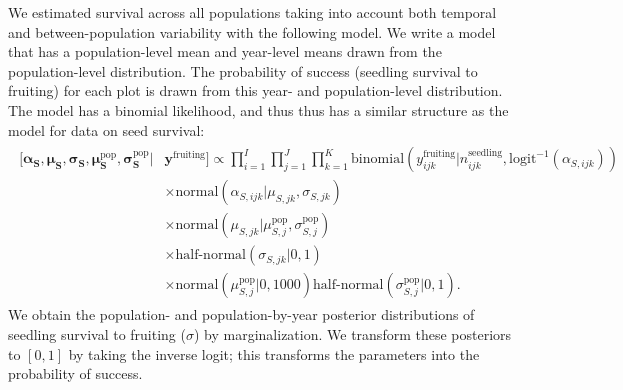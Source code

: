 \documentclass[12pt, oneside, titlepage]{article}   	%
\begin{document}
We estimated survival across all populations taking into account both temporal and between-population variability with the following model. We write a model that has a population-level mean and year-level means drawn from the population-level distribution. The probability of success (seedling survival to fruiting) for each plot is drawn from this year- and population-level distribution. The model has a binomial likelihood, and thus thus has a similar structure as the model for data on seed survival:
%
\begin{align}
  \begin{split}
 [  \bm{\alpha_S} , \bm{\mu_S} , \bm{\sigma_S} , \bm{\mu^\mathrm{pop}_S}, \bm{\sigma^\mathrm{pop}_S} | & \bm{y^{\mathrm{fruiting}}}  ] \propto \prod_{i=1}^{I}   \prod_{j=1}^{J}  \prod_{k=1}^{K} 
   \mathrm{binomial} ( y^{\mathrm{fruiting}}_{ijk} | n^\mathrm{seedling}_{ijk}, \mathrm{logit}^{-1}( \alpha_{S,ijk} ) ) 
   \\ & \times \mathrm{normal} ( \alpha_{S,ijk}  | \mu_{S,jk}, \sigma{_{S,jk} })
  \\ & \times \mathrm{normal} ( \mu_{S,jk}  | \mu^\mathrm{pop}_{S,j}, \sigma^\mathrm{pop}_{S,j} )
  \\ & \times \textrm{half-normal} ( \sigma_{S,jk} | 0,1)
  \\ & \times \mathrm{normal} ( \mu^\mathrm{pop}_{S,j} | 0 , 1000 ) \textrm{half-normal} ( \sigma^\mathrm{pop}_{S,j} | 0,1).
  \end{split}
\end{align}
%
We obtain the population- and population-by-year posterior distributions of seedling survival to fruiting ($\sigma$) by marginalization. We transform these posteriors to $[0,1]$ by taking the inverse logit; this transforms the parameters into the probability of success.

\end{document}
